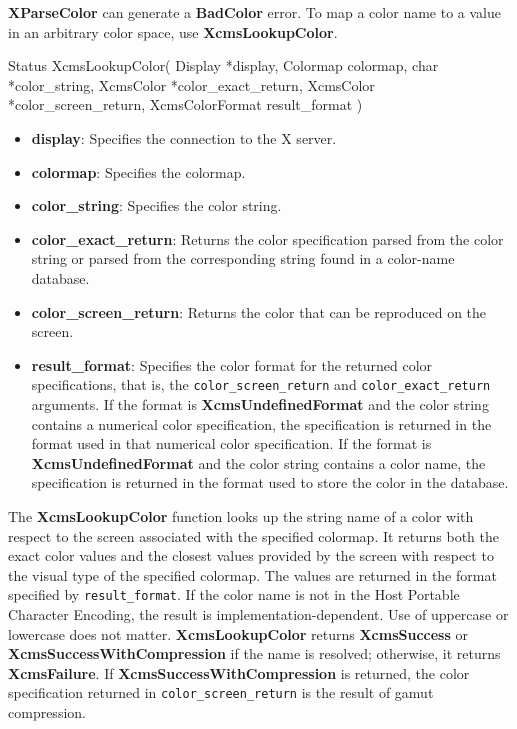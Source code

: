 \documentclass{report}
\begin{document}
\begin{itemize}
            \bigbreak \noindent
            \textbf{XParseColor} can generate a \textbf{BadColor} error.
            \bigbreak \noindent
            To map a color name to a value in an arbitrary color space, use \textbf{XcmsLookupColor}.
            \bigbreak \noindent
            \begin{cppcode}
                Status XcmsLookupColor(
                    Display *display,
                    Colormap colormap,
                    char *color_string,
                    XcmsColor *color_exact_return,
                    XcmsColor *color_screen_return,
                    XcmsColorFormat result_format
                )
            \end{cppcode}
            \bigbreak \noindent
            \begin{itemize}
                \item \textbf{display}: Specifies the connection to the X server.
                \item \textbf{colormap}: Specifies the colormap.
                \item \textbf{color\_string}: Specifies the color string.
                \item \textbf{color\_exact\_return}: Returns the color specification parsed from the color string or parsed from the corresponding string found in a color-name database.
                \item \textbf{color\_screen\_return}: Returns the color that can be reproduced on the screen.
                \item \textbf{result\_format}: Specifies the color format for the returned color specifications, that is, the \texttt{color\_screen\_return} and \texttt{color\_exact\_return} arguments. If the format is \textbf{XcmsUndefinedFormat} and the color string contains a numerical color specification, the specification is returned in the format used in that numerical color specification. If the format is \textbf{XcmsUndefinedFormat} and the color string contains a color name, the specification is returned in the format used to store the color in the database.
            \end{itemize}
            \bigbreak \noindent
            The \textbf{XcmsLookupColor} function looks up the string name of a color with respect to the screen associated with the specified colormap. It returns both the exact color values and the closest values provided by the screen with respect to the visual type of the specified colormap. The values are returned in the format specified by \texttt{result\_format}. If the color name is not in the Host Portable Character Encoding, the result is implementation-dependent. Use of uppercase or lowercase does not matter. \textbf{XcmsLookupColor} returns \textbf{XcmsSuccess} or \textbf{XcmsSuccessWithCompression} if the name is resolved; otherwise, it returns \textbf{XcmsFailure}. If \textbf{XcmsSuccessWithCompression} is returned, the color specification returned in \texttt{color\_screen\_return} is the result of gamut compression.

\end{itemize}
\end{document}
